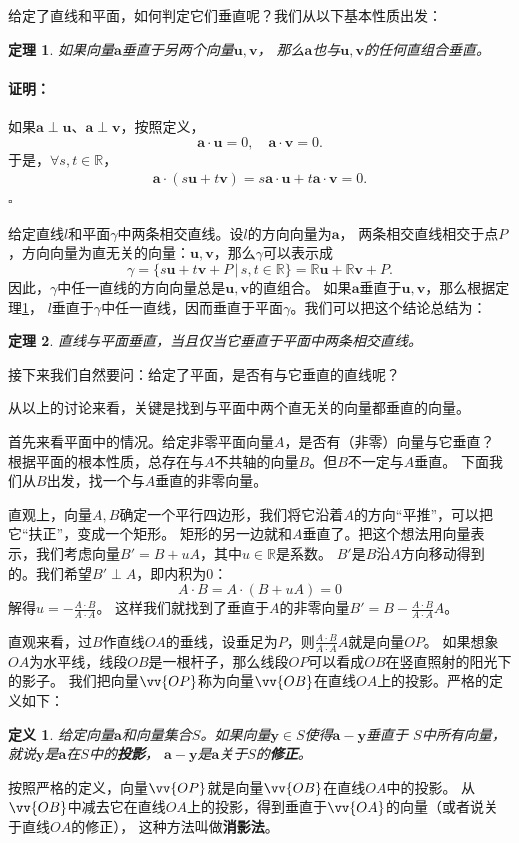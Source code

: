 \documentclass[12pt,UTF8]{ctexbook}
\newtheorem{df}{定义}[section]
\newtheorem{tm}{定理}[section]
\renewenvironment{proof}{\paragraph{\textbf{证明：}}}{\hfill$\square$}
\begin{document}
给定了直线和平面，如何判定它们垂直呢？我们从以下基本性质出发：
\begin{tm}\label{tm:1-3-10}
    如果向量$\mathbf{a}$垂直于另两个向量$\mathbf{u},\mathbf{v}$，
    那么$\mathbf{a}$也与$\mathbf{u},\mathbf{v}$的任何直组合垂直。
\end{tm}
\begin{proof}
    如果$\mathbf{a}\perp \mathbf{u}$、$\mathbf{a}\perp \mathbf{v}$，按照定义，
    $$ \mathbf{a}\cdot \mathbf{u} = 0, \quad \mathbf{a}\cdot \mathbf{v} = 0. $$
    于是，$\forall s, t\in\mathbb{R}$，
    \begin{align*}
        \mathbf{a}\cdot (s\mathbf{u} + t\mathbf{v}) = s\mathbf{a}\cdot \mathbf{u} + t\mathbf{a}\cdot \mathbf{v} = 0. 
    \end{align*}
\end{proof}

给定直线$l$和平面$\gamma$中两条相交直线。设$l$的方向向量为$\mathbf{a}$，
两条相交直线相交于点$P$，方向向量为直无关的向量：$\mathbf{u},\mathbf{v}$，那么$\gamma$可以表示成
$$ \gamma = \{s\mathbf{u} + t\mathbf{v} + P \, | \, s,t\in\mathbb{R}\} = \mathbb{R}\mathbf{u} + \mathbb{R}\mathbf{v} + P. $$
因此，$\gamma$中任一直线的方向向量总是$\mathbf{u},\mathbf{v}$的直组合。
如果$\mathbf{a}$垂直于$\mathbf{u},\mathbf{v}$，那么根据定理\ref{tm:1-3-10}，
$l$垂直于$\gamma$中任一直线，因而垂直于平面$\gamma$。我们可以把这个结论总结为：
\begin{tm}\label{tm:1-3-20}
    直线与平面垂直，当且仅当它垂直于平面中两条相交直线。
\end{tm}
接下来我们自然要问：给定了平面，是否有与它垂直的直线呢？

从以上的讨论来看，关键是找到与平面中两个直无关的向量都垂直的向量。

首先来看平面中的情况。给定非零平面向量$A$，是否有（非零）向量与它垂直？
根据平面的根本性质，总存在与$A$不共轴的向量$B$。但$B$不一定与$A$垂直。
下面我们从$B$出发，找一个与$A$垂直的非零向量。

直观上，向量$A,B$确定一个平行四边形，我们将它沿着$A$的方向“平推”，可以把它“扶正”，变成一个矩形。
矩形的另一边就和$A$垂直了。把这个想法用向量表示，我们考虑向量$B' = B + uA$，其中$u\in\mathbb{R}$是系数。
$B'$是$B$沿$A$方向移动得到的。我们希望$B'\perp A$，即内积为$0$：
$$ A\cdot B = A\cdot (B + uA) = 0$$
解得$u = -\frac{A\cdot B}{A\cdot A}$。
这样我们就找到了垂直于$A$的非零向量$B' = B -\frac{A\cdot B}{A\cdot A}A$。

直观来看，过$B$作直线$OA$的垂线，设垂足为$P$，则$\frac{A\cdot B}{A\cdot A}A$就是向量$OP$。
如果想象$OA$为水平线，线段$OB$是一根杆子，那么线段$OP$可以看成$OB$在竖直照射的阳光下的影子。
我们把向量$\vv{OP}$称为向量$\vv{OB}$在直线$OA$上的投影。严格的定义如下：
\begin{df}\label{df:1-3-20}
    给定向量$\mathbf{a}$和向量集合$S$。如果向量$\mathbf{y}\in S$使得$\mathbf{a} - \mathbf{y}$垂直于
    $S$中所有向量，就说$\mathbf{y}$是$\mathbf{a}$在$S$中的\textbf{投影}，
    $\mathbf{a} - \mathbf{y}$是$\mathbf{a}$关于$S$的\textbf{修正}。
\end{df}
按照严格的定义，向量$\vv{OP}$就是向量$\vv{OB}$在直线$OA$中的投影。
从$\vv{OB}$中减去它在直线$OA$上的投影，得到垂直于$\vv{OA}$的向量（或者说关于直线$OA$的修正），
这种方法叫做\textbf{消影法}。
\end{document}
